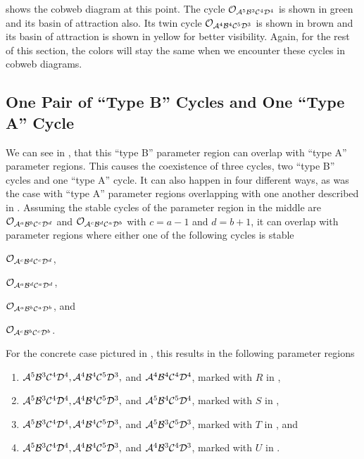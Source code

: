  shows the cobweb diagram at this point.
The cycle $\mathcal{O}_{\mathcal{A}^5\mathcal{B}^3\mathcal{C}^4\mathcal{D}^4}$ is shown in green and its basin of attraction also.
Its twin cycle $\mathcal{O}_{\mathcal{A}^4\mathcal{B}^4\mathcal{C}^5\mathcal{D}^3}$ is shown in brown and its basin of attraction is shown in yellow for better visibility.
Again, for the rest of this section, the colors will stay the same when we encounter these cycles in cobweb diagrams.

\subsection{One Pair of ``Type B'' Cycles and One ``Type A'' Cycle}
\label{sec:arch.coex.AB}

We can see in , that this ``type B'' parameter region can overlap with ``type A'' parameter regions.
This causes the coexistence of three cycles, two ``type B'' cycles and one ``type A'' cycle.
It can also happen in four different ways, as was the case with ``type A'' parameter regions overlapping with one another described in .
Assuming the stable cycles of the parameter region in the middle are $\mathcal{O}_{\mathcal{A}^a\mathcal{B}^b\mathcal{C}^c\mathcal{D}^d}$ and $\mathcal{O}_{\mathcal{A}^c\mathcal{B}^d\mathcal{C}^a\mathcal{D}^b}$ with $c = a - 1$ and $d = b + 1$, it can overlap with parameter regions where either one of the following cycles is stable
\begin{enumerate*}
	\item $\mathcal{O}_{\mathcal{A}^c\mathcal{B}^d\mathcal{C}^c\mathcal{D}^d}$,
	\item $\mathcal{O}_{\mathcal{A}^a\mathcal{B}^d\mathcal{C}^a\mathcal{D}^d}$,
	\item $\mathcal{O}_{\mathcal{A}^a\mathcal{B}^b\mathcal{C}^a\mathcal{D}^b}$, and
	\item $\mathcal{O}_{\mathcal{A}^c\mathcal{B}^b\mathcal{C}^c\mathcal{D}^b}$.
\end{enumerate*}
For the concrete case pictured in , this results in the following parameter regions
\begin{enumerate}
	\item $\mathcal{A}^5\mathcal{B}^3\mathcal{C}^4\mathcal{D}^4, \mathcal{A}^4\mathcal{B}^4\mathcal{C}^5\mathcal{D}^3,$ and $\mathcal{A}^4\mathcal{B}^4\mathcal{C}^4\mathcal{D}^4$, marked with $R$ in ,
	\item $\mathcal{A}^5\mathcal{B}^3\mathcal{C}^4\mathcal{D}^4, \mathcal{A}^4\mathcal{B}^4\mathcal{C}^5\mathcal{D}^3,$ and $\mathcal{A}^5\mathcal{B}^4\mathcal{C}^5\mathcal{D}^4$, marked with $S$ in ,
	\item $\mathcal{A}^5\mathcal{B}^3\mathcal{C}^4\mathcal{D}^4, \mathcal{A}^4\mathcal{B}^4\mathcal{C}^5\mathcal{D}^3,$ and $\mathcal{A}^5\mathcal{B}^3\mathcal{C}^5\mathcal{D}^3$, marked with $T$ in , and
	\item $\mathcal{A}^5\mathcal{B}^3\mathcal{C}^4\mathcal{D}^4, \mathcal{A}^4\mathcal{B}^4\mathcal{C}^5\mathcal{D}^3,$ and $\mathcal{A}^4\mathcal{B}^3\mathcal{C}^4\mathcal{D}^3$, marked with $U$ in .
\end{enumerate}

